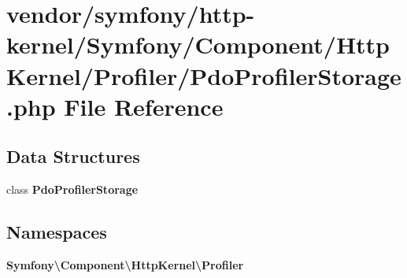 \section{vendor/symfony/http-\/kernel/\+Symfony/\+Component/\+Http\+Kernel/\+Profiler/\+Pdo\+Profiler\+Storage.php File Reference}
\label{_pdo_profiler_storage_8php}
\subsection*{Data Structures}
\begin{DoxyCompactItemize}
\item 
class {\bf Pdo\+Profiler\+Storage}
\end{DoxyCompactItemize}
\subsection*{Namespaces}
\begin{DoxyCompactItemize}
\item 
 {\bf Symfony\textbackslash{}\+Component\textbackslash{}\+Http\+Kernel\textbackslash{}\+Profiler}
\end{DoxyCompactItemize}
